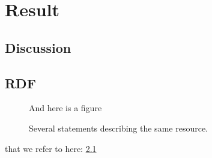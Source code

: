 \documentclass[a4paper,11pt]{kth-mag}
\begin{document}
  \part{Result}
    \chapter{Discussion}
  \printbibliography
  \appendix
  \addappheadtotoc
  \chapter{RDF}\label{appA}
    \begin{figure}[ht]
      \begin{center}
        And here is a figure
        \caption{\small{Several statements describing the same resource.}}\label{RDF_4}
      \end{center}
    \end{figure}
  that we refer to here: \ref{RDF_4}
\end{document}
